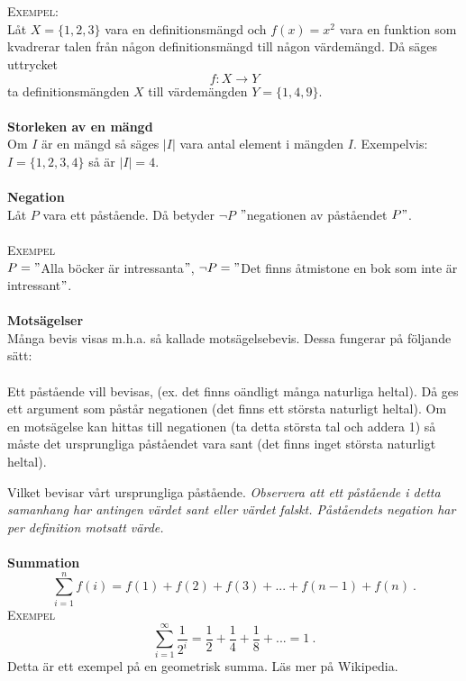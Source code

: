 \documentclass{article}
\begin{document}
\\ \\
\textsc{Exempel:}
\\
Låt $X=\{1,2,3\}$ vara en definitionsmängd och $f(x)=x^2$ vara en funktion som kvadrerar talen från någon definitionsmängd till någon värdemängd. Då säges uttrycket
\begin{equation*}
    f:X\longrightarrow Y
\end{equation*}
ta definitionsmängden $X$ till värdemängden $Y=\{1,4,9\}$.
\\ \\
\textbf{Storleken av en mängd} \\
Om $I$ är en mängd så säges $|I|$ vara antal element i mängden $I$. Exempelvis: $I=\{1,2,3,4\}$ så är $|I|=4$. 
\\ \\
\textbf{Negation}
\\
Låt $P$ vara ett påstående. Då betyder $\neg P$ $"$negationen av påståendet $P"$. 
\\ \\
\textsc{Exempel}
\\
$P="$Alla böcker är intressanta$"$, $\neg P="$Det finns åtmistone en bok som inte är intressant$"$. 
\\ \\
\textbf{Motsägelser}
\\
Många bevis visas m.h.a. så kallade motsägelsebevis. Dessa fungerar på följande sätt:
\\ \\
Ett påstående vill bevisas, (ex. det finns oändligt många naturliga heltal). Då ges ett argument som påstår negationen (det finns ett största naturligt heltal). Om en motsägelse kan hittas till negationen (ta detta största tal och addera 1) så måste det ursprungliga påståendet vara sant (det finns inget största naturligt heltal).

Vilket bevisar vårt ursprungliga påstående. \textit{Observera att ett påstående i detta samanhang har antingen värdet sant eller värdet falskt. Påståendets negation har per definition motsatt värde.}
\\ \\
\textbf{Summation}
\begin{equation*}
    \sum_{i=1}^nf(i)=f(1)+f(2)+f(3)+...+f(n-1)+f(n) \ .
\end{equation*}
\textsc{Exempel}
\\
$$ \sum_{i=1}^{\infty}\frac{1}{2^i}=\frac{1}{2}+\frac{1}{4}+\frac{1}{8}+...=1 \ . $$
Detta är ett exempel på en geometrisk summa. Läs mer på Wikipedia.
\newpage
\end{document}
